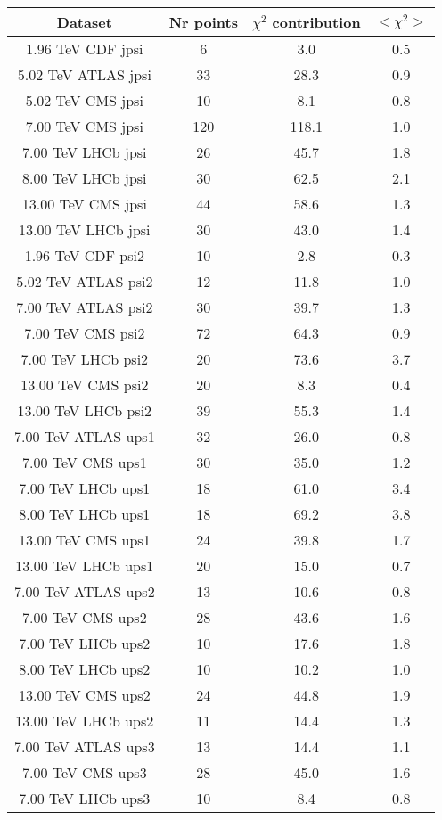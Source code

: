 \begin{table}[h!]
\centering
\begin{tabular}{c|c|c|c}
Dataset & Nr points & $\chi^2$ contribution & $<\chi^2>$ \\
\hline
1.96 TeV CDF jpsi & 6 & 3.0 & 0.5 \\
5.02 TeV ATLAS jpsi & 33 & 28.3 & 0.9 \\
5.02 TeV CMS jpsi & 10 & 8.1 & 0.8 \\
7.00 TeV CMS jpsi & 120 & 118.1 & 1.0 \\
7.00 TeV LHCb jpsi & 26 & 45.7 & 1.8 \\
8.00 TeV LHCb jpsi & 30 & 62.5 & 2.1 \\
13.00 TeV CMS jpsi & 44 & 58.6 & 1.3 \\
13.00 TeV LHCb jpsi & 30 & 43.0 & 1.4 \\
1.96 TeV CDF psi2 & 10 & 2.8 & 0.3 \\
5.02 TeV ATLAS psi2 & 12 & 11.8 & 1.0 \\
7.00 TeV ATLAS psi2 & 30 & 39.7 & 1.3 \\
7.00 TeV CMS psi2 & 72 & 64.3 & 0.9 \\
7.00 TeV LHCb psi2 & 20 & 73.6 & 3.7 \\
13.00 TeV CMS psi2 & 20 & 8.3 & 0.4 \\
13.00 TeV LHCb psi2 & 39 & 55.3 & 1.4 \\
7.00 TeV ATLAS ups1 & 32 & 26.0 & 0.8 \\
7.00 TeV CMS ups1 & 30 & 35.0 & 1.2 \\
7.00 TeV LHCb ups1 & 18 & 61.0 & 3.4 \\
8.00 TeV LHCb ups1 & 18 & 69.2 & 3.8 \\
13.00 TeV CMS ups1 & 24 & 39.8 & 1.7 \\
13.00 TeV LHCb ups1 & 20 & 15.0 & 0.7 \\
7.00 TeV ATLAS ups2 & 13 & 10.6 & 0.8 \\
7.00 TeV CMS ups2 & 28 & 43.6 & 1.6 \\
7.00 TeV LHCb ups2 & 10 & 17.6 & 1.8 \\
8.00 TeV LHCb ups2 & 10 & 10.2 & 1.0 \\
13.00 TeV CMS ups2 & 24 & 44.8 & 1.9 \\
13.00 TeV LHCb ups2 & 11 & 14.4 & 1.3 \\
7.00 TeV ATLAS ups3 & 13 & 14.4 & 1.1 \\
7.00 TeV CMS ups3 & 28 & 45.0 & 1.6 \\
7.00 TeV LHCb ups3 & 10 & 8.4 & 0.8 \\

\end{tabular}
\end{table}
